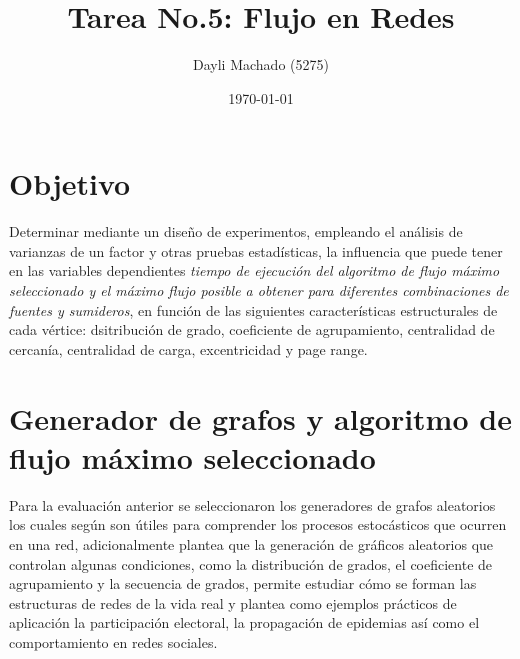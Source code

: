\documentclass{article}
\begin{document}
\title{Tarea No.5: Flujo en Redes}
\author{Dayli Machado (5275)}
\date{\today}
\maketitle

\section{Objetivo}

Determinar mediante un diseño de experimentos, empleando el análisis de varianzas de un factor y otras pruebas estadísticas, la influencia que puede tener en las variables dependientes\textit{ tiempo de ejecución del algoritmo de flujo máximo seleccionado y el máximo flujo posible a obtener para diferentes combinaciones de fuentes y sumideros}, en función de las siguientes características estructurales de cada vértice: dsitribución de grado, coeficiente de agrupamiento, centralidad de cercanía, centralidad de carga, excentricidad y page range. 

\section{Generador de grafos y algoritmo de flujo máximo seleccionado}

Para la evaluación anterior se seleccionaron los generadores de grafos aleatorios los cuales según \cite{Valerie} son útiles para comprender los procesos estocásticos que ocurren en una red, adicionalmente plantea que  la generación de gráficos aleatorios que controlan algunas condiciones, como la distribución de grados, el coeficiente de agrupamiento y la secuencia de grados, permite estudiar cómo se forman las estructuras de redes de la vida real y plantea como ejemplos prácticos de aplicación la participación electoral, la propagación de epidemias así como el comportamiento en redes sociales.
\end{document}
